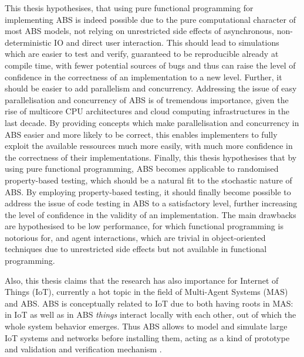 This thesis hypothesises, that using pure functional programming for implementing ABS is indeed possible due to the pure computational character of most ABS models, not relying on unrestricted side effects of asynchronous, non-deterministic IO and direct user interaction. This should lead to simulations which are easier to test and verify, guaranteed to be reproducible already at compile time, with fewer potential sources of bugs and thus can raise the level of confidence in the correctness of an implementation to a new level. Further, it should be easier to add parallelism and concurrency. Addressing the issue of easy parallelisation and concurrency of ABS is of tremendous importance, given the rise of multicore CPU architectures and cloud computing infrastructures in the last decade. By providing concepts which make parallelisation and concurrency in ABS easier and more likely to be correct, this enables implementers to fully exploit the available ressources much more easily, with much more confidence in the correctness of their implementations. Finally, this thesis hypothesises that by using pure functional programming, ABS becomes applicable to randomised property-based testing, which should be a natural fit to the stochastic nature of ABS. By employing property-based testing, it should finally become possible to address the issue of code testing in ABS to a satisfactory level, further increasing the level of confidence in the validity of an implementation. The main drawbacks are hypothesised to be low performance, for which functional programming is notorious for, and agent interactions, which are trivial in object-oriented techniques due to unrestricted side effects but not available in functional programming. 

Also, this thesis claims that the research has also importance for Internet of Things (IoT), currently a hot topic in the field of Multi-Agent Systems (MAS) and ABS. ABS is conceptually related to IoT due to both having roots in MAS: in IoT as well as in ABS \textit{things} interact locally with each other, out of which the whole system behavior emerges. Thus ABS allows to model and simulate large IoT systems and networks before installing them, acting as a kind of prototype and validation and verification mechanism \cite{savaglio_agent-based_2018}.

